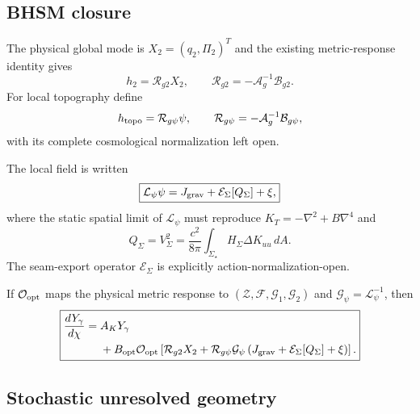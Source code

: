 \subsection{BHSM closure}

The physical global mode is $X_2=(q_2,\Pi_2)^T$ and the existing
metric-response identity gives
\begin{equation}
h_2=\mathcal R_{g2}X_2,
\qquad
\mathcal R_{g2}=-\mathcal A_g^{-1}\mathcal B_{g2}.
\end{equation}
For local topography define
\begin{equation}
h_{\rm topo}
=
\mathcal R_{g\psi}\psi,
\qquad
\mathcal R_{g\psi}
=
-\mathcal A_g^{-1}\mathcal B_{g\psi},
\end{equation}
with its complete cosmological normalization left open.

The local field is written
\begin{equation}
\boxed{
\mathcal L_\psi\psi
=
J_{\rm grav}
+
\mathcal E_\Sigma[Q_\Sigma]
+
\xi,
}
\label{eq:optical-psi-source}
\end{equation}
where the static spatial limit of $\mathcal L_\psi$ must reproduce
$K_T=-\nabla^2+B\nabla^4$ and
\begin{equation}
Q_\Sigma
=
V_\Sigma^2
=
\frac{c^2}{8\pi}
\int_{\Sigma_\star}
H_\Sigma\Delta K_{uu}\,dA.
\end{equation}
The seam-export operator $\mathcal E_\Sigma$ is explicitly
action-normalization-open.

If $\mathcal O_{\rm opt}$ maps the physical metric response to
$(\mathcal Z,\mathcal F,\mathcal G_1,\mathcal G_2)$ and
$\mathcal G_\psi=\mathcal L_\psi^{-1}$, then
\begin{equation}
\boxed{
\begin{aligned}
\frac{dY_\gamma}{d\chi}
={}&
A_KY_\gamma\\
&+
B_{\rm opt}\mathcal O_{\rm opt}
\left[
\mathcal R_{g2}X_2
+
\mathcal R_{g\psi}\mathcal G_\psi
\left(
J_{\rm grav}
+
\mathcal E_\Sigma[Q_\Sigma]
+
\xi
\right)
\right].
\end{aligned}
}
\label{eq:bhsm-optical-transfer}
\end{equation}

\subsection{Stochastic unresolved geometry}

